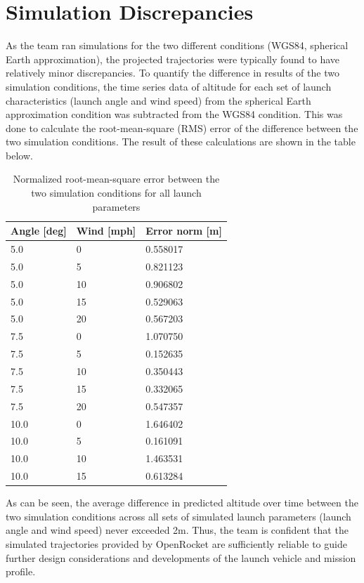 \section{Simulation Discrepancies}
As the team ran simulations for the two different conditions (WGS84, spherical Earth approximation), the projected trajectories were typically found to have relatively minor discrepancies. To quantify the difference in results of the two simulation conditions, the time series data of altitude for each set of launch characteristics (launch angle and wind speed) from the spherical Earth approximation condition was subtracted from the WGS84 condition. This was done to calculate the root-mean-square (RMS) error of the difference between the two simulation conditions. The result of these calculations are shown in the table below.
\begin{table}[H]
\centering
\caption{Normalized root-mean-square error between the two simulation conditions for all launch parameters}
\label{tab:FlightDynamics:AverageError}
\begin{tabularx}{.5\linewidth}{llX}
\toprule
 \textbf{Angle [deg]} &  \textbf{Wind [mph]} &  \textbf{Error norm [m]} \\
\midrule
   5.0 &     0 &    0.558017 \\
   5.0 &     5 &    0.821123 \\
   5.0 &    10 &    0.906802 \\
   5.0 &    15 &    0.529063 \\
   5.0 &    20 &    0.567203 \\
   7.5 &     0 &    1.070750 \\
   7.5 &     5 &    0.152635 \\
   7.5 &    10 &    0.350443 \\
   7.5 &    15 &    0.332065 \\
   7.5 &    20 &    0.547357 \\
  10.0 &     0 &    1.646402 \\
  10.0 &     5 &    0.161091 \\
  10.0 &    10 &    1.463531 \\
  10.0 &    15 &    0.613284 \\
\bottomrule
\end{tabularx}
\end{table}
As can be seen, the average difference in predicted altitude over time between the two simulation conditions across all sets of simulated launch parameters (launch angle and wind speed) never exceeded 2m. Thus, the team is confident that the simulated trajectories provided by OpenRocket are sufficiently reliable to guide further design considerations and developments of the launch vehicle and mission profile. 
